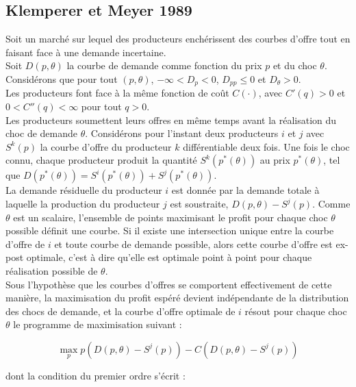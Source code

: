 \subsection*{Klemperer et Meyer 1989}
Soit un marché sur lequel des producteurs enchérissent des courbes d'offre tout en faisant face à une demande incertaine.\\

Soit $D(p,\theta)$ la courbe de demande comme fonction du prix $p$ et du choc $\theta$. Considérons que pour tout $(p,\theta)$, $-\infty<D_p<0$, $D_{pp}\leq 0$ et $D_\theta>0$.\\

Les producteurs font face à la même fonction de coût $C(\cdot)$, avec $C'(q)>0$ et $0<C''(q)<\infty$ pour tout $q>0$.\\

Les producteurs soumettent leurs offres en même temps avant la réalisation du choc de demande $\theta$. Considérons pour l'instant deux producteurs $i$ et $j$ avec $S^k(p)$ la courbe d'offre du producteur $k$ différentiable deux fois. Une fois le choc connu, chaque producteur produit la quantité $S^k(p^*(\theta))$ au prix $p^*(\theta)$, tel que $D(p^*(\theta)) = S^i(p^*(\theta)) + S^j(p^*(\theta))$.\\

La demande résiduelle du producteur $i$ est donnée par la demande totale à  laquelle la production du producteur $j$ est soustraite, $D(p,\theta) - S^j(p)$. Comme $\theta$ est un scalaire, l'ensemble de points maximisant le profit pour chaque choc $\theta$ possible définit une courbe. Si il existe une intersection unique entre la courbe d'offre de $i$ et toute courbe de demande possible, alors cette courbe d'offre est ex-post optimale, c'est à dire qu'elle est optimale point à point pour chaque réalisation possible de $\theta$. \\

Sous l'hypothèse que les courbes d'offres se comportent effectivement de cette manière, la maximisation du profit espéré devient indépendante de la distribution des chocs de demande, et la courbe d'offre optimale de $i$ résout pour chaque choc $\theta$ le programme de maximisation suivant :

\begin{equation}\label{maxKMfr}
\max_p p\left( D(p,\theta) - S^j(p)\right) - C\left( D(p,\theta) - S^j(p)\right) 
\end{equation}

dont la condition du premier ordre s'écrit :

